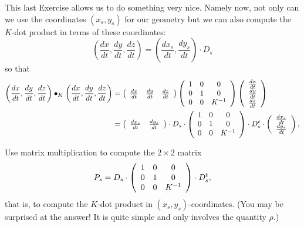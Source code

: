 \documentclass{ximera}
\begin{document}
This last Exercise allows us to do something very nice. Namely now, not only
can we use the coordinates $\left(  x_{s},y_{s}\right)  $ for our geometry but
we can also compute the $K$-dot product in terms of these coordinates:%
\[
\left(  \frac{dx}{dt},\frac{dy}{dt},\frac{dz}{dt}\right)  =\left(
\frac{dx_{s}}{dt},\frac{dy_{s}}{dt}\right)  \cdot D_{s}%
\]
so that%
\begin{align*}
\left(  \frac{dx}{dt},\frac{dy}{dt},\frac{dz}{dt}\right)  \bullet_{K}\left(
\frac{dx}{dt},\frac{dy}{dt},\frac{dz}{dt}\right)   &  =\left(
\begin{array}
[c]{ccc}%
\frac{dx}{dt} & \frac{dy}{dt} & \frac{dz}{dt}%
\end{array}
\right)  \left(
\begin{array}
[c]{ccc}%
1 & 0 & 0\\
0 & 1 & 0\\
0 & 0 & K^{-1}%
\end{array}
\right)  \left(
\begin{array}
[c]{c}%
\frac{dx}{dt}\\
\frac{dy}{dt}\\
\frac{dz}{dt}%
\end{array}
\right) \\
&  =\left(
\begin{array}
[c]{cc}%
\frac{dx_{s}}{dt} & \frac{dy_{s}}{dt}%
\end{array}
\right)  \cdot D_{s}\cdot\left(
\begin{array}
[c]{ccc}%
1 & 0 & 0\\
0 & 1 & 0\\
0 & 0 & K^{-1}%
\end{array}
\right)  \cdot D_{s}^{t}\cdot\left(
\begin{array}
[c]{c}%
\frac{dx_{s}}{dt}\\
\frac{dy_{s}}{dt}%
\end{array}
\right)  ,
\end{align*}


\begin{exercise}
\label{36}Use matrix multiplication to compute the $2\times2$ matrix%
\[
P_{s}=D_{s}\cdot\left(
\begin{array}
[c]{ccc}%
1 & 0 & 0\\
0 & 1 & 0\\
0 & 0 & K^{-1}%
\end{array}
\right)  \cdot D_{s}^{t},
\]
that is, to compute the $K$-dot product in $\left(  x_{s},y_{s}\right)
$-coordinates. (You may be surprised at the answer! It is quite simple and
only involves the quantity $\rho$.)
\end{exercise}
\end{document}
